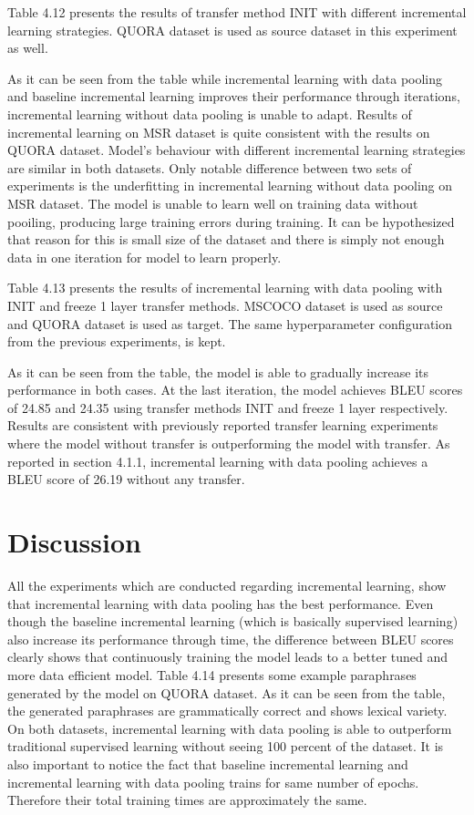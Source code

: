 Table 4.12 presents the results of transfer method INIT with different incremental learning strategies. QUORA dataset is used as source dataset in this experiment as well. 

As it can be seen from the table while incremental learning with data pooling and baseline incremental learning improves their performance through iterations, incremental learning without data pooling is unable to adapt. Results of incremental learning on MSR dataset is quite consistent with the results on QUORA dataset. Model's behaviour with different incremental learning strategies are similar in both datasets. Only notable difference between two sets of experiments is the underfitting in incremental learning without data pooling on MSR dataset. The model is unable to learn well on training data without pooiling, producing large training errors during training. It can be hypothesized that reason for this is small size of the dataset and there is simply not enough data in one iteration for model to learn properly. 

Table 4.13 presents the results of incremental learning with data pooling with INIT and freeze 1 layer transfer methods. MSCOCO dataset is used as source and QUORA dataset is used as target. The same hyperparameter configuration from the previous experiments, is kept.

As it can be seen from the table, the model is able to gradually increase its performance in both cases. At the last iteration, the model achieves BLEU scores of 24.85 and 24.35 using transfer methods INIT and freeze 1 layer respectively. Results are consistent with previously reported transfer learning experiments where the model without transfer is outperforming the model with transfer. As reported in section 4.1.1, incremental learning with data pooling achieves a BLEU score of 26.19 without any transfer.  

\section{Discussion}

All the experiments which are conducted regarding incremental learning, show that incremental learning with data pooling has the best performance. Even though the baseline incremental learning (which is basically supervised learning) also increase its performance through time, the difference between BLEU scores clearly shows that continuously training the model leads to a better tuned and more data efficient model. Table 4.14 presents some example paraphrases generated by the model on QUORA dataset. As it can be seen from the table, the generated paraphrases are grammatically correct and shows lexical variety. On both datasets, incremental learning with data pooling is able to outperform traditional supervised learning without seeing 100 percent of the dataset. It is also important to notice the fact that baseline incremental learning and incremental learning with data pooling trains for same number of epochs. Therefore their total training times are approximately the same. 

